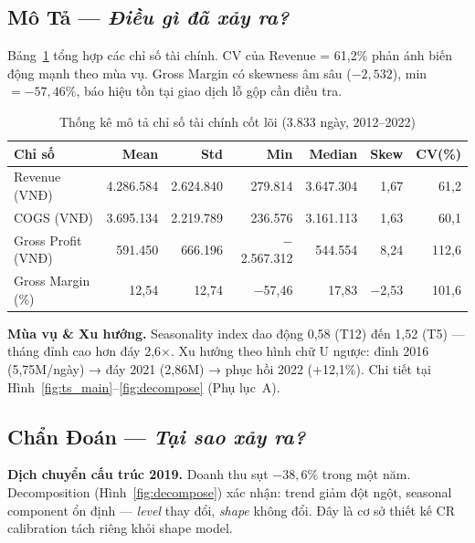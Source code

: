 \documentclass{article}
\begin{document}
\vspace{-2pt}
\subsection{Mô Tả — \textit{Điều gì đã xảy ra?}}
\vspace{-2pt}

Bảng~\ref{tab:desc} tổng hợp các chỉ số tài chính. CV của Revenue = 61,2\% phản ánh biến động mạnh theo mùa vụ. Gross Margin có skewness âm sâu ($-2,532$), min $= -57,46\%$, báo hiệu tồn tại giao dịch lỗ gộp cần điều tra.

\begin{table}[h!]
\centering
\caption{Thống kê mô tả chỉ số tài chính cốt lõi (3.833 ngày, 2012–2022)}
\label{tab:desc}
\footnotesize
\setlength{\tabcolsep}{4pt}
\begin{tabular}{lrrrrrr}
\toprule
\textbf{Chỉ số} & \textbf{Mean} & \textbf{Std} & \textbf{Min} & \textbf{Median} & \textbf{Skew} & \textbf{CV(\%)} \\
\midrule
Revenue (VNĐ)      & 4.286.584 & 2.624.840 & 279.814  & 3.647.304 & 1,67  & 61,2 \\
COGS (VNĐ)         & 3.695.134 & 2.219.789 & 236.576  & 3.161.113 & 1,63  & 60,1 \\
Gross Profit (VNĐ) & 591.450   & 666.196   & $-$2.567.312 & 544.554 & 8,24 & 112,6 \\
Gross Margin (\%)  & 12,54     & 12,74     & $-$57,46 & 17,83     & $-$2,53 & 101,6 \\
\bottomrule
\end{tabular}
\end{table}

\textbf{Mùa vụ \& Xu hướng.} Seasonality index dao động 0,58 (T12) đến 1,52 (T5) — tháng đỉnh cao hơn đáy 2,6×. Xu hướng theo hình chữ U ngược: đỉnh 2016 (5,75M/ngày) → đáy 2021 (2,86M) → phục hồi 2022 (+12,1\%). Chi tiết tại Hình~\ref{fig:ts_main}–\ref{fig:decompose} (Phụ lục~A).

\vspace{-2pt}
\subsection{Chẩn Đoán — \textit{Tại sao xảy ra?}}
\vspace{-2pt}

\textbf{Dịch chuyển cấu trúc 2019.} Doanh thu sụt $-38,6\%$ trong một năm. Decomposition (Hình~\ref{fig:decompose}) xác nhận: trend giảm đột ngột, seasonal component ổn định — \textit{level} thay đổi, \textit{shape} không đổi. Đây là cơ sở thiết kế CR calibration tách riêng khỏi shape model.
\end{document}
